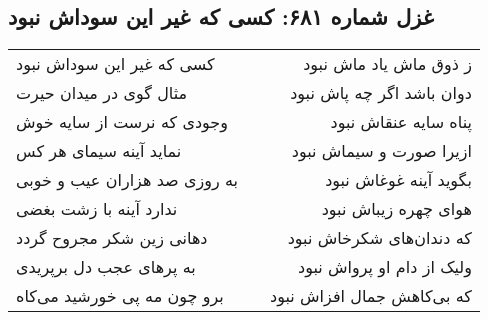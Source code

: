 \begin{center}
\section*{غزل شماره ۶۸۱: کسی که غیر این سوداش نبود}
\label{sec:0681}
\begin{longtable}{l p{0.5cm} r}
کسی که غیر این سوداش نبود
&&
ز ذوق ماش یاد ماش نبود
\\
مثال گوی در میدان حیرت
&&
دوان باشد اگر چه پاش نبود
\\
وجودی که نرست از سایه خوش
&&
پناه سایه عنقاش نبود
\\
نماید آینه سیمای هر کس
&&
ازیرا صورت و سیماش نبود
\\
به روزی صد هزاران عیب و خوبی
&&
بگوید آینه غوغاش نبود
\\
ندارد آینه با زشت بغضی
&&
هوای چهره زیباش نبود
\\
دهانی زین شکر مجروح گردد
&&
که دندان‌های شکرخاش نبود
\\
به پرهای عجب دل برپریدی
&&
ولیک از دام او پرواش نبود
\\
برو چون مه پی خورشید می‌کاه
&&
که بی‌کاهش جمال افزاش نبود
\\
\end{longtable}
\end{center}
